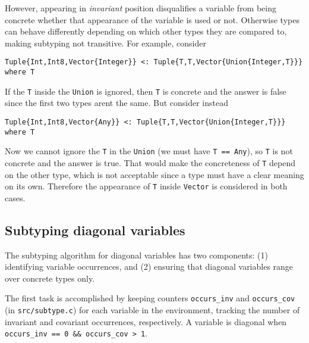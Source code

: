 However, appearing in \emph{invariant} position disqualifies a variable from being concrete whether that appearance of the variable is used or not. Otherwise types can behave differently depending on which other types they are compared to, making subtyping not transitive. For example, consider




\begin{verbatim}
Tuple{Int,Int8,Vector{Integer}} <: Tuple{T,T,Vector{Union{Integer,T}}} where T
\end{verbatim}



If the \texttt{T} inside the \texttt{Union} is ignored, then \texttt{T} is concrete and the answer is {\textquotedbl}false{\textquotedbl} since the first two types aren{\textquotesingle}t the same. But consider instead




\begin{verbatim}
Tuple{Int,Int8,Vector{Any}} <: Tuple{T,T,Vector{Union{Integer,T}}} where T
\end{verbatim}



Now we cannot ignore the \texttt{T} in the \texttt{Union} (we must have \texttt{T == Any}), so \texttt{T} is not concrete and the answer is {\textquotedbl}true{\textquotedbl}. That would make the concreteness of \texttt{T} depend on the other type, which is not acceptable since a type must have a clear meaning on its own. Therefore the appearance of \texttt{T} inside \texttt{Vector} is considered in both cases.



\hypertarget{12600482412457091491}{}


\subsection{Subtyping diagonal variables}



The subtyping algorithm for diagonal variables has two components: (1) identifying variable occurrences, and (2) ensuring that diagonal variables range over concrete types only.



The first task is accomplished by keeping counters \texttt{occurs\_inv} and \texttt{occurs\_cov} (in \texttt{src/subtype.c}) for each variable in the environment, tracking the number of invariant and covariant occurrences, respectively. A variable is diagonal when \texttt{occurs\_inv == 0 \&\& occurs\_cov > 1}.



